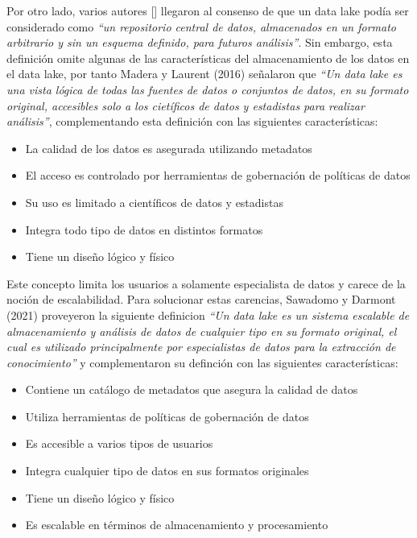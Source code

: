 Por otro lado, varios autores [\cite*{mathis2017data, khine2018data,couto2019mapping}] llegaron al consenso de que un data lake podía
ser considerado como \textit{``un repositorio central de datos, almacenados en un formato arbitrario y sin un esquema definido, para futuros análisis''}. Sin embargo,
esta definición omite algunas de las características del almacenamiento de los datos en el data lake, por tanto Madera y Laurent (2016) \cite{madera2016next} señalaron que
\textit{``Un data lake es una vista lógica de todas las fuentes de datos o conjuntos de datos, en su formato original, accesibles solo a
los cietíficos de datos y estadistas para realizar análisis''}, complementando esta definición con las siguientes características:
\begin{itemize}
    \item La calidad de los datos es asegurada utilizando metadatos
    \item El acceso es controlado por herramientas de gobernación de políticas de datos
    \item Su uso es limitado a científicos de datos y estadistas 
    \item Integra todo tipo de datos en distintos formatos
    \item Tiene un diseño lógico y físico
\end{itemize}
Este concepto limita los usuarios a solamente especialista de datos y carece de la noción de escalabilidad. Para
solucionar estas carencias, Sawadomo y Darmont (2021) \cite{sawadogo2021data} proveyeron la siguiente
definicion \textit{``Un data lake es un sistema escalable de almacenamiento y análisis de datos de cualquier tipo en su formato original,
el cual es utilizado principalmente por especialistas de datos para la extracción de conocimiento''} y complementaron su definción con las siguientes
características:
\begin{itemize}
    \item Contiene un catálogo de metadatos que asegura la calidad de datos
    \item Utiliza herramientas de políticas de gobernación de datos
    \item Es accesible a varios tipos de usuarios 
    \item Integra cualquier tipo de datos en sus formatos originales
    \item Tiene un diseño lógico y físico
    \item Es escalable en términos de almacenamiento y procesamiento
\end{itemize}

